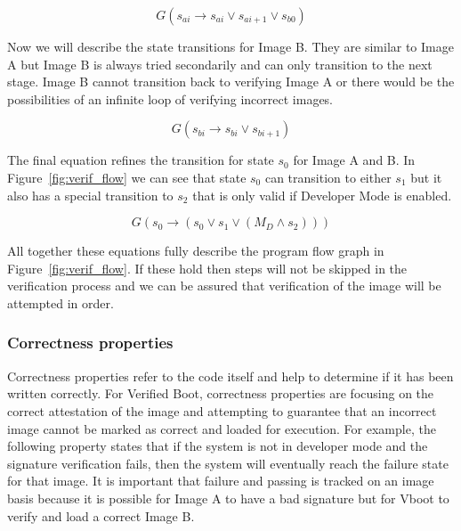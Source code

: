\documentclass[../report.tex]{subfiles}
\begin{document}
\begin{equation}
    G(s_{ai} \to s_{ai} \lor s_{ai+1} \lor s_{b0})
\end{equation}

Now we will describe the state transitions for Image B. 
They are similar to Image A but Image B is always tried secondarily and can only transition to the next stage. 
Image B cannot transition back to verifying Image A or there would be the possibilities of an infinite loop of verifying incorrect images.

\begin{equation}
    G(s_{bi} \to s_{bi} \lor s_{bi+1})
\end{equation}

The final equation refines the transition for state $s_0$ for Image A and B.
In Figure~\ref{fig:verif_flow} we can see that state $s_0$ can transition to either $s_1$ but it also has a special transition to $s_2$ that is only valid if Developer Mode is enabled.

\begin{equation}
    G(s_0 \to (s_0 \lor s_{1} \lor (M_D \land s_{2})))
\end{equation}

All together these equations fully describe the program flow graph in Figure~\ref{fig:verif_flow}. 
If these hold then steps will not be skipped in the verification process and we can be assured that verification of the image will be attempted in order.

\subsubsection{Correctness properties}

Correctness properties refer to the code itself and help to determine if it has been written correctly.
For Verified Boot, correctness properties are focusing on the correct attestation of the image and attempting to guarantee that an incorrect image cannot be marked as correct and loaded for execution.
For example, the following property states that if the system is not in developer mode and the signature verification fails, then the system will eventually reach the failure state for that image.
It is important that failure and passing is tracked on an image basis because it is possible for Image A to have a bad signature but for Vboot to verify and load a correct Image B.
\end{document}
